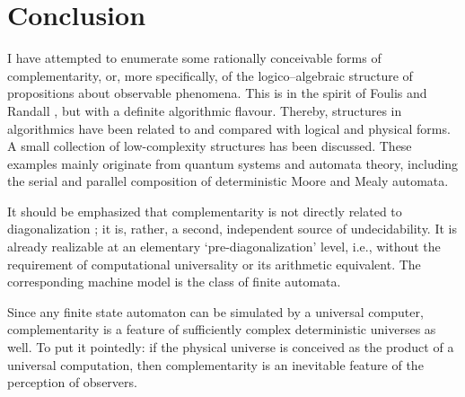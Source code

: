 \section{Conclusion}

I have attempted
to enumerate some rationally
conceivable forms of complementarity, or, more specifically,
of the logico--algebraic structure of propositions about observable
phenomena. This is in the spirit of Foulis and Randall
\cite{Foulis-Randall,ran-foul-73}, but with a definite algorithmic
flavour.    Thereby, structures in algorithmics have been related to and
compared with logical and  physical forms.
A small collection of  low-complexity structures has been discussed.
These examples mainly originate from quantum systems and automata
theory, including the serial and parallel composition of deterministic
Moore and Mealy automata.



It should be emphasized that
complementarity  is not directly
related to diagonalization \cite{godel1,turing-36,rogers1,odi:89}; it
is, rather,  a
second, independent source of undecidability. It is already
realizable at an elementary `pre-diagonalization' level,
 i.e., without
the requirement of computational universality or its arithmetic
equivalent.
The corresponding machine model is the class of finite automata.

Since any finite state
automaton can be simulated by a universal computer, complementarity is a
feature of sufficiently complex deterministic universes as well.
 To put it pointedly: if
the physical
universe is conceived as the product of a universal computation,
then complementarity is an inevitable feature of the
perception of
observers.



%
%


